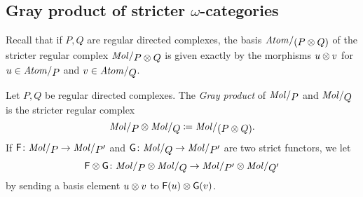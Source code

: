 

\subsection{Gray product of stricter \texorpdfstring{$\omega$}{ω}-categories}

Recall that if \( P, Q \) are regular directed complexes, the basis \( \atomin{(P \gray Q)} \) of the stricter regular complex \( \molecin{P \gray Q} \) is given exactly by the morphisms \( u \otimes v \) for \( u \in \atomin{P} \) and \( v \in \atomin{Q} \).  

\begin{dfn}  \label{dfn:gray_product_of_stricter_regular_complexes}
    Let \( P, Q \) be regular directed complexes.
    The \emph{Gray product} of \( \molecin{P} \) and \( \molecin{Q} \) is the stricter regular complex
    \begin{equation*}
        \molecin{P} \gray \molecin{Q} \eqdef \molecin{(P \gray Q)}.
    \end{equation*}
    If \( \F \colon \molecin{P} \to \molecin{P'} \) and \( \G \colon \molecin{Q} \to \molecin{P'} \) are two strict functors, we let 
    \begin{equation*}
        \F \gray \G \colon \molecin{P} \gray \molecin{Q} \to  \molecin{P'} \gray \molecin{Q'}
    \end{equation*}
    by sending a basis element \( u \otimes v \) to \( \mathsf{F}(u) \otimes \mathsf{G}(v) \).
\end{dfn}

